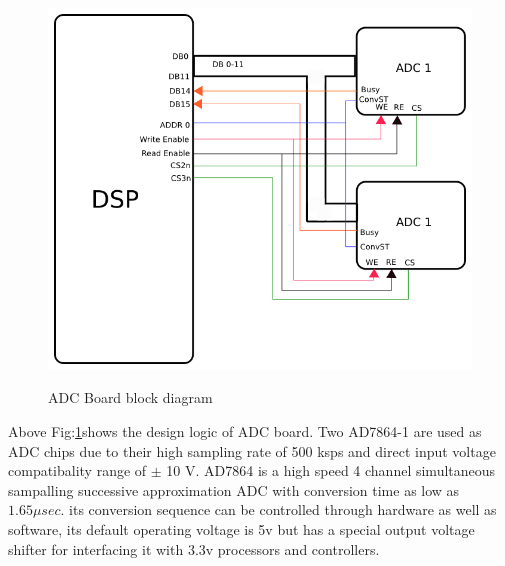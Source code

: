\begin{figure}[ht]
\includegraphics[width=\columnwidth]{fig/ADC_board.png}
\label{fig:adc_board}
\caption{ADC Board block diagram}
\end{figure}
Above Fig:\ref{fig:adc_board}shows the design logic of ADC board. Two AD7864-1 are used as ADC chips due to their high sampling rate of 500 ksps and direct input voltage compatibality range of $\pm$ 10 V. AD7864 is a high speed 4 channel simultaneous sampalling successive approximation ADC with conversion time as low as $1.65 \mu sec$. its conversion sequence can be controlled through hardware as well as software, its default operating voltage is 5v but has a special output voltage shifter for interfacing it with 3.3v processors and controllers.